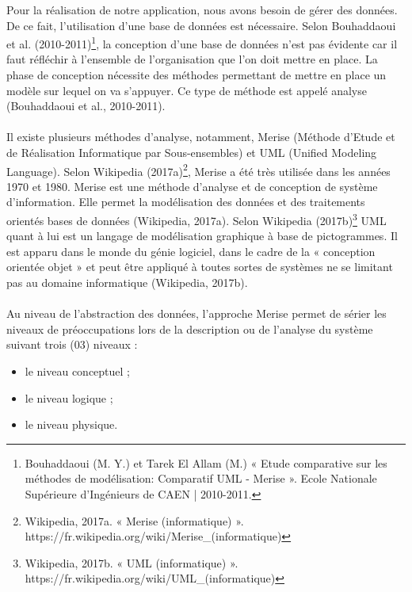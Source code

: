 Pour la réalisation de notre application, nous avons besoin de gérer des données. De ce fait, l'utilisation d'une base de données est nécessaire. Selon Bouhaddaoui et al. (2010-2011)\footnote{Bouhaddaoui (M. Y.) et Tarek El Allam (M.) « Etude comparative sur les méthodes de modélisation: Comparatif UML - Merise ». Ecole Nationale Supérieure d'Ingénieurs de CAEN | 2010-2011.}, la conception d'une base de données n'est pas évidente car il faut réfléchir à l'ensemble de l'organisation que l'on doit mettre en place. La phase de conception nécessite des méthodes permettant de mettre en place un modèle sur lequel on va s'appuyer. Ce type de méthode est appelé analyse (Bouhaddaoui et al., 2010-2011).
\\$ $\\Il existe plusieurs méthodes d'analyse, notamment, Merise (Méthode d’Etude et de Réalisation Informatique par Sous-ensembles) et UML (Unified Modeling Language).
Selon Wikipedia (2017a)\footnote{Wikipedia, 2017a. « Merise (informatique) ». https://fr.wikipedia.org/wiki/Merise\_(informatique)}, Merise a été très utilisée dans les années 1970 et 1980. Merise est une méthode d’analyse et de conception de système d’information. Elle permet la modélisation des données et des traitements orientés bases de données (Wikipedia, 2017a). Selon Wikipedia (2017b)\footnote{Wikipedia, 2017b. « UML (informatique) ». https://fr.wikipedia.org/wiki/UML\_(informatique)} UML quant à lui est un langage de modélisation graphique à base de pictogrammes. Il est apparu dans le monde du génie logiciel, dans le cadre de la « conception orientée objet » et peut être appliqué à toutes sortes de systèmes ne se limitant pas au domaine informatique (Wikipedia, 2017b).
\\$ $\\Au niveau de l'abstraction des données, l’approche Merise permet de sérier les niveaux de préoccupations lors de la description ou de l'analyse du système suivant trois (03) niveaux :
\begin{itemize}
\item[\textbullet] le niveau conceptuel ;
\item[\textbullet] le niveau logique ;
\item[\textbullet] le niveau physique.
\end{itemize}

